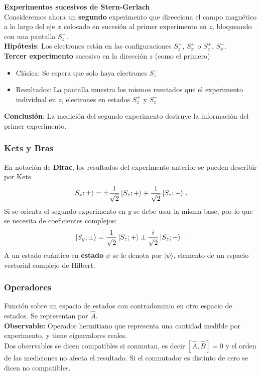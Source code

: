 \documentclass[xcolor=dvipsnames,slidestop,compress,mathserif, 11pt]{beamer}
\begin{document}
\begin{frame}
	\textbf{Experimentos sucesivos de Stern-Gerlach}\\
	\justifying Consideremos ahora un \textbf{segundo} experimento que direcciona el campo magnético a lo largo del eje $x$ colocado en sucesión al primer experimento en $z$, bloqueando con una pantalla $S_z^-$.\\
	\textbf{Hipótesis}: Los electrones están en las configuraciones $S_z^+$, $S_x^+$ o $S_z^+$, $S_x^-$.\\
	\justifying \textbf{Tercer experimento} sucesivo en la dirección $z$ (como el primero)
	\begin{itemize}
		\item Clásica: Se espera que solo haya electrones $S_z^-$
		\item Resultados: La pantalla muestra los mismos resutados que el experimento individual en $z$, electrones en estados $S_z^+$ y $S_z^-$
	\end{itemize}
	\textbf{Conclusión}: La medición del segundo experimento destruye la información del primer experimento.
\end{frame}

\begin{frame}[c]
	\frametitle{Kets y Bras}
	En notación de \textbf{Dirac}, los resultados del experimento anterior se pueden describir por Kets
	\begin{equation*}
		\ket{S_x; \pm} = \pm \frac{1}{\sqrt{2}}\ket{S_z; +} + \frac{1}{\sqrt{2}}\ket{S_z; -}\,.
	\end{equation*}
	Si se orienta el segundo experimento en $y$ se debe usar la misma base, por lo que se necesita de coeficientes complejos:
	\begin{equation*}
		\ket{S_y; \pm} = \frac{1}{\sqrt{2}}\ket{S_z; +} \pm \frac{i}{\sqrt{2}}\ket{S_z; -}\,.
	\end{equation*}
	A un estado cuántico en \textbf{estado} $\psi$ se le denota por $\vert \psi \rangle$, elemento de un espacio vectorial complejo de Hilbert.
\end{frame}

\begin{frame}[c]
	\frametitle{Operadores}
	\jusifying Función sobre un espacio de estados con contradominio en otro espacio de estados. Se representan por $\hat{A}$.\\
	\justifying \textbf{Observable:} Operador hermitiano que representa una cantidad medible por experimento, y tiene eigenvalores reales. \\
	\justifying Dos observables se dicen compatibles si conmutan, es decir $[\hat{A}, \hat{B}] = 0$ y el orden de las mediciones no afecta el resultado. Si el conmutador es distinto de cero se dicen no compatibles.
\end{frame}
\end{document}
